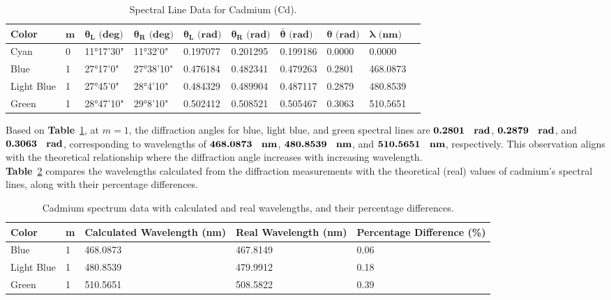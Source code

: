 \documentclass[a4paper,11pt]{article}
\begin{document}
\begin{table}[H]
  \centering
  \begin{tabular}{llllllllll}
  \toprule
  \textbf{Color} & \(\boldsymbol{m}\) & \(\boldsymbol{\theta_L \text{ (deg)}}\) & \(\boldsymbol{\theta_R \text{ (deg)}}\) & \(\boldsymbol{\theta_L \text{ (rad)}}\) & \(\boldsymbol{\theta_R \text{ (rad)}}\) & \(\boldsymbol{\bar \theta \text{ (rad)}}\) & \(\boldsymbol{\theta \text{ (rad)}}\) & \(\boldsymbol{\lambda \text{ (nm)}}\) \\
  \midrule
  Cyan      & 0 & 11°17'30" & 11°32'0"  & 0.197077 & 0.201295 & 0.199186 & 0.0000 & 0.0000 \\
  Blue  & 1 & 27°17'0"  & 27°38'10" & 0.476184 & 0.482341 & 0.479263 & 0.2801 & 468.0873 \\
  Light Blue & 1 & 27°45'0"  & 28°4'10"  & 0.484329 & 0.489904 & 0.487117 & 0.2879 & 480.8539 \\
  Green      & 1 & 28°47'10" & 29°8'10"  & 0.502412 & 0.508521 & 0.505467 & 0.3063 & 510.5651 \\
  \bottomrule
  \end{tabular}
  \caption{Spectral Line Data for Cadmium (Cd).}
  \label{tab:spectral_data_cd}
\end{table}

\quad Based on \textbf{Table}~\ref{tab:spectral_data_cd}, at \(m = 1\), the diffraction angles for blue, light blue, and green spectral lines are \(\textbf{0.2801 \, \text{rad}}\), \(\textbf{0.2879 \, \text{rad}}\), and \(\textbf{0.3063 \, \text{rad}}\), corresponding to wavelengths of \(\textbf{468.0873 \, \text{nm}}\), \(\textbf{480.8539 \, \text{nm}}\), and \(\textbf{510.5651 \, \text{nm}}\), respectively. This observation aligns with the theoretical relationship where the diffraction angle increases with increasing wavelength.\\

\textbf{Table}~\ref{tab:Cadmium_spectrum} compares the wavelengths calculated from the diffraction measurements with the theoretical (real) values of cadmium's spectral lines, along with their percentage differences.

\begin{table}[ht]
  \centering
  \begin{tabular}{lllll}
  \toprule
  \textbf{Color} & \textbf{m} & \textbf{Calculated Wavelength (nm)} & \textbf{Real Wavelength (nm)} & \textbf{Percentage Difference (\%)} \\
  \midrule
  Blue       & 1 & 468.0873 & 467.8149 & 0.06 \\
  Light Blue & 1 & 480.8539 & 479.9912 & 0.18 \\
  Green      & 1 & 510.5651 & 508.5822 & 0.39 \\
  \bottomrule
  \end{tabular}
  \caption{Cadmium spectrum data with calculated and real wavelengths, and their percentage differences.\cite{sciencephoto_cadmium_spectrum}\cite{nist_cadmium_spectrum}}
  \label{tab:Cadmium_spectrum}
  \end{table}
\end{document}
